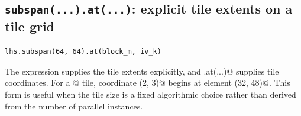 \subsection*{\texttt{subspan(.\allowbreak{}.\allowbreak{}.\allowbreak{}).\allowbreak{}at(.\allowbreak{}.\allowbreak{}.\allowbreak{})}: explicit tile extents on a tile grid}

\begin{lstlisting}[language=croqtile,caption={subspan(...).at(...): explicit tile extents on a tile grid}]
lhs.subspan(64, 64).at(block_m, iv_k)
\end{lstlisting}

The \co@subspan@ expression supplies the tile extents explicitly, and \co@.at(...)@ supplies tile coordinates. For a \co@[16, 16]@ tile, coordinate \co@(2, 3)@ begins at element \co@(32, 48)@. This form is useful when the tile size is a fixed algorithmic choice rather than derived from the number of parallel instances.
